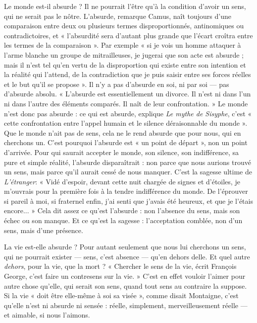 Le monde est-il absurde ? Il ne pourrait l’être qu’à la condition d’avoir
un sens, qui ne serait pas le nôtre. L’absurde, remarque Camus, naît toujours
d’une comparaison entre deux ou plusieurs termes disproportionnés,
antinomiques ou contradictoires, et « l’absurdité sera d’autant plus grande
que l'écart croîtra entre les termes de la comparaison ». Par exemple « si je
vois un homme attaquer à l’arme blanche un groupe de mitrailleuses, je
jugerai que son acte est absurde ; mais il n’est tel qu’en vertu de la disproportion
qui existe entre son intention et la réalité qui l'attend, de la contradiction
que je puis saisir entre ses forces réelles et le but qu’il se propose ».
Il n’y a pas d’absurde en soi, ni par soi — pas d’absurde absolu. « L’absurde
est essentiellement un divorce. Il n’est ni dans l’un ni dans l’autre des éléments
comparés. Il naît de leur confrontation. » Le monde n’est donc pas
absurde : ce qui est absurde, explique {\it Le mythe de Sisyphe}, c'est « cette
confrontation entre l’appel humain et le silence déraisonnable du monde ».
Que le monde n’ait pas de sens, cela ne le rend absurde que pour nous, qui
en cherchons un. C’est pourquoi l’absurde est « un point de départ », non
un point d'arrivée. Pour qui saurait accepter le monde, son silence, son
indifférence, sa pure et simple réalité, l'absurde disparaîtrait : non parce que
nous aurions trouvé un sens, mais parce qu'il aurait cessé de nous manquer.
C’est la sagesse ultime de {\it L'étranger}: « Vidé d’espoir, devant cette nuit
chargée de signes et d’étoiles, je m’ouvrais pour la première fois à la tendre
indifférence du monde. De l’éprouver si pareil à moi, si fraternel enfin, j'ai
senti que j'avais été heureux, et que je l’étais encore... » Cela dit assez ce
qu’est l'absurde : non l'absence du sens, mais son échec ou son manque. Et
ce qu'est la sagesse : l’acceptation comblée, non d’un sens, mais d’une présence.

La vie est-elle absurde ? Pour autant seulement que nous lui cherchons un
sens, qui ne pourrait exister — sens, c’est absence — qu’en dehors delle. Et quel
autre {\it dehors}, pour la vie, que la mort ? « Chercher le sens de la vie, écrit François
George, c’est faire un contresens sur la vie. » C’est en effet vouloir l'aimer
pour autre chose qu’elle, qui serait son sens, quand tout sens au contraire la
suppose. Si la vie « doit être elle-même à soi sa visée », comme disait Montaigne,
c'est qu’elle n’est ni absurde ni sensée : réelle, simplement, merveilleusement
réelle — et aimable, si nous l’aimons.

